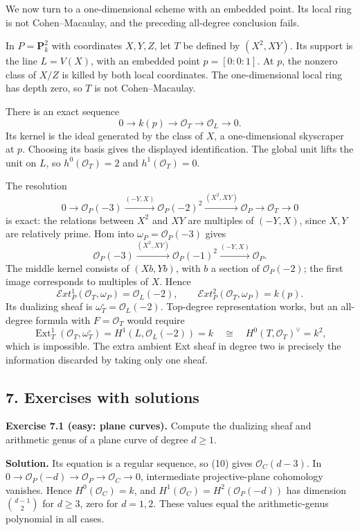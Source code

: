 \documentclass[11pt]{article}
\begin{document}
We now turn to a one-dimensional scheme with an embedded point. Its
local ring is not Cohen--Macaulay, and the preceding all-degree
conclusion fails.

In \(P=\mathbf P^2_k\) with coordinates \(X,Y,Z\), let \(T\) be defined
by \((X^2,XY)\). Its support is the line \(L=V(X)\), with an embedded
point \(p=[0:0:1]\). At \(p\), the nonzero class of \(X/Z\) is killed by
both local coordinates. The one-dimensional local ring has depth zero,
so \(T\) is not Cohen--Macaulay.

There is an exact sequence \[
0\to k(p)\to\mathcal O_T\to\mathcal O_L\to0.
\] Its kernel is the ideal generated by the class of \(X\), a
one-dimensional skyscraper at \(p\). Choosing its basis gives the
displayed identification. The global unit lifts the unit on \(L\), so
\(h^0(\mathcal O_T)=2\) and \(h^1(\mathcal O_T)=0\).

The resolution \[
0\to\mathcal O_P(-3)\xrightarrow{(-Y,X)}
 \mathcal O_P(-2)^2\xrightarrow{(X^2,XY)}
 \mathcal O_P\to\mathcal O_T\to0
\] is exact: the relations between \(X^2\) and \(XY\) are multiples of
\((-Y,X)\), since \(X,Y\) are relatively prime. Hom into
\(\omega_P=\mathcal O_P(-3)\) gives \[
\mathcal O_P(-3)\xrightarrow{(X^2,XY)}
 \mathcal O_P(-1)^2\xrightarrow{(-Y,X)}\mathcal O_P.
\] The middle kernel consists of \((Xb,Yb)\), with \(b\) a section of
\(\mathcal O_P(-2)\); the first image corresponds to multiples of \(X\).
Hence \[
\mathcal E xt^1_P(\mathcal O_T,\omega_P)=\mathcal O_L(-2),
\qquad\mathcal E xt^2_P(\mathcal O_T,\omega_P)=k(p).
\] Its dualizing sheaf is \(\omega_T^\circ=\mathcal O_L(-2)\).
Top-degree representation works, but an all-degree formula with
\(F=\mathcal O_T\) would require \[
\operatorname{Ext}^1_T(\mathcal O_T,\omega_T^\circ)
 =H^1(L,\mathcal O_L(-2))=k
 \quad\cong\quad H^0(T,\mathcal O_T)^\vee=k^2,
\] which is impossible. The extra ambient Ext sheaf in degree two is
precisely the information discarded by taking only one sheaf.

\subsection{7. Exercises with solutions}\label{exercises-with-solutions}

\textbf{Exercise 7.1 (easy: plane curves).} Compute the dualizing sheaf
and arithmetic genus of a plane curve of degree \(d\geq1\).

\textbf{Solution.} Its equation is a regular sequence, so (10) gives
\(\mathcal O_C(d-3)\). In
\(0\to\mathcal O_P(-d)\to\mathcal O_P\to\mathcal O_C\to0\), intermediate
projective-plane cohomology vanishes. Hence \(H^0(\mathcal O_C)=k\), and
\(H^1(\mathcal O_C)=H^2(\mathcal O_P(-d))\) has dimension
\(\binom{d-1}{2}\) for \(d\geq3\), zero for \(d=1,2\). These values
equal the arithmetic-genus polynomial in all cases.
\end{document}
